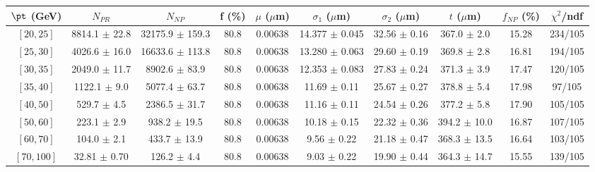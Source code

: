 \begin{tabular}{c||c|c|c|c|c|c|c||c|c}
$\pt$ (GeV) & $N_{PR}$ & $N_{NP}$ & f (\%) & $\mu$ ($\mu$m) & $\sigma_1$ ($\mu$m) & $\sigma_2$ ($\mu$m)  & $t$ ($\mu$m) & $f_{NP}$ (\%) & $\chi^2$/ndf \\
\hline
$[20, 25]$ & 8814.1 $\pm$ 22.8 & 32175.9 $\pm$ 159.3 & 80.8 & 0.00638 & 14.377 $\pm$ 0.045 & 32.56 $\pm$ 0.16 & 367.0 $\pm$ 2.0 & 15.28 & 234/105\\
$[25, 30]$ & 4026.6 $\pm$ 16.0 & 16633.6 $\pm$ 113.8 & 80.8 & 0.00638 & 13.280 $\pm$ 0.063 & 29.60 $\pm$ 0.19 & 369.8 $\pm$ 2.8 & 16.81 & 194/105\\
$[30, 35]$ & 2049.0 $\pm$ 11.7 & 8902.6 $\pm$ 83.9 & 80.8 & 0.00638 & 12.353 $\pm$ 0.083 & 27.83 $\pm$ 0.24 & 371.3 $\pm$ 3.9 & 17.47 & 120/105\\
$[35, 40]$ & 1122.1 $\pm$ 9.0 & 5077.4 $\pm$ 63.7 & 80.8 & 0.00638 & 11.69 $\pm$ 0.11 & 25.67 $\pm$ 0.27 & 378.8 $\pm$ 5.4 & 17.98 & 97/105\\
$[40, 50]$ & 529.7 $\pm$ 4.5 & 2386.5 $\pm$ 31.7 & 80.8 & 0.00638 & 11.16 $\pm$ 0.11 & 24.54 $\pm$ 0.26 & 377.2 $\pm$ 5.8 & 17.90 & 105/105\\
$[50, 60]$ & 223.1 $\pm$ 2.9 & 938.2 $\pm$ 19.5 & 80.8 & 0.00638 & 10.18 $\pm$ 0.15 & 22.32 $\pm$ 0.36 & 394.2 $\pm$ 10.0 & 16.87 & 107/105\\
$[60, 70]$ & 104.0 $\pm$ 2.1 & 433.7 $\pm$ 13.9 & 80.8 & 0.00638 & 9.56 $\pm$ 0.22 & 21.18 $\pm$ 0.47 & 368.3 $\pm$ 13.5 & 16.64 & 103/105\\
$[70, 100]$ & 32.81 $\pm$ 0.70 & 126.2 $\pm$ 4.4 & 80.8 & 0.00638 & 9.03 $\pm$ 0.22 & 19.90 $\pm$ 0.44 & 364.3 $\pm$ 14.7 & 15.55 & 139/105\\
\end{tabular}
